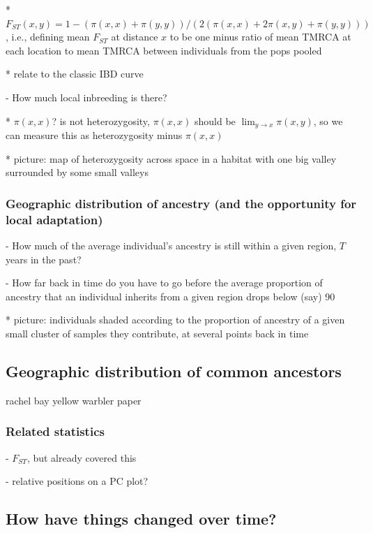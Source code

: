 \documentclass{ar-1col}
\begin{document}
            * $F_{ST}(x,y) = 1 - (\pi(x,x) + \pi(y,y))/(2 (\pi(x,x) + 2 \pi(x,y) + \pi(y,y)))$,
                i.e., defining mean $F_{ST}$ at distance $x$ to be one minus ratio of mean TMRCA at each location
                to mean TMRCA between individuals from the pops pooled

            * relate to the classic IBD curve

        - How much local inbreeding is there?

            * $\pi(x,x)$? is not heterozygosity, $\pi(x,x)$ should be $\lim_{y \to x} \pi(x,y)$,
                so we can measure this as heterozygosity minus $\pi(x,x)$

            * picture: map of heterozygosity across space in a habitat with one big valley surrounded by some small valleys


\subsubsection{Geographic distribution of ancestry (and the opportunity for local adaptation)}

        - How much of the average individual's ancestry is still within a given region, $T$ years in the past?

        - How far back in time do you have to go before the average proportion of ancestry that an individual inherits
            from a given region drops below (say) 90%
          
            * picture: individuals shaded according to the proportion of ancestry of a given small cluster of samples
                they contribute, at several points back in time
              
\subsection{Geographic distribution of common ancestors}
    rachel bay yellow warbler paper

\subsubsection{Related statistics}

        - $F_{ST}$, but already covered this

        - relative positions on a PC plot?

\subsection{How have things changed over time?}
\end{document}
